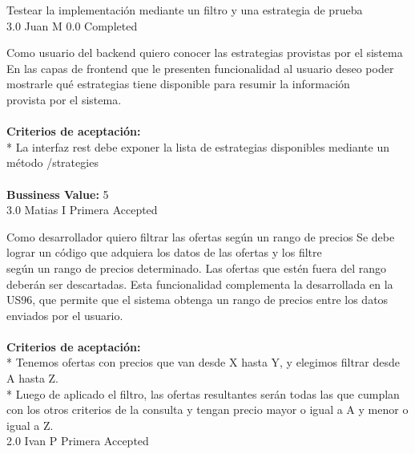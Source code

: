 		{Testear la implementación mediante un filtro y una estrategia de prueba} %
		{\\
} %
		{3.0} %
		{Juan M} %
		{0.0} %
		{Completed} %


\vspace{20pt}

	{Como usuario del backend quiero conocer las estrategias provistas por el sistema} %
	{En las capas de frontend que le presenten funcionalidad al usuario deseo poder\\
mostrarle qué estrategias tiene disponible para resumir la información\\
provista por el sistema.\\
  \\
\textbf{Criterios de aceptación:}\\
* La interfaz rest debe exponer la lista de estrategias disponibles mediante un método /strategies\\
  \\
\textbf{Bussiness Value:} 5\\
} %
	{} %
	{3.0} %
	{Matias I} %
	{Primera} %
	{Accepted} %


\vspace{20pt}

	{Como desarrollador quiero filtrar las ofertas según un rango de precios} %
	{Se debe lograr un código que adquiera los datos de las ofertas y los filtre\\
según un rango de precios determinado. Las ofertas que estén fuera del rango\\
deberán ser descartadas. Esta funcionalidad complementa la desarrollada en la\\
US96, que permite que el sistema obtenga un rango de precios entre los datos\\
enviados por el usuario.\\
  \\
\textbf{Criterios de aceptación:}\\
* Tenemos ofertas con precios que van desde X hasta Y, y elegimos filtrar desde A hasta Z.   \\
* Luego de aplicado el filtro, las ofertas resultantes serán todas las que cumplan con los otros criterios de la consulta y tengan precio mayor o igual a A y menor o igual a Z.  \\
} %
	{} %
	{2.0} %
	{Ivan P} %
	{Primera} %
	{Accepted} %

